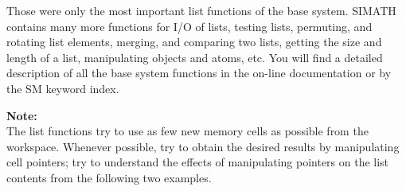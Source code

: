 \leer\leer
Those were only the most important list functions of the base system. SIMATH contains
many more functions for I/O of lists, testing lists, permuting, and rotating list
elements, merging, and comparing two lists, getting the size and length of a list,
manipulating objects and atoms, etc. You will find a detailed description of all
the base system functions in the on-line documentation or by the SM keyword
index.

\newpage

{\bf Note:}\\[2ex]
The list functions try to use as few new memory cells as possible from the workspace. Whenever
possible, try to obtain the desired results by manipulating cell pointers; try to understand the effects
of manipulating pointers on the list contents from the following two examples.

